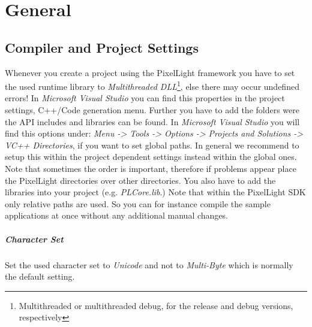 \chapter{General}




\section{Compiler and Project Settings}
Whenever you create a project using the PixelLight framework you have to set the used runtime library to \emph{Multithreaded \ac{DLL}}\footnote{Multithreaded or multithreaded debug, for the release and debug versions, respectively}, else there may occur undefined errors! In \emph{Microsoft Visual Studio} you can find this properties in the project settings, C++/Code generation menu. Further you have to add the folders were the \ac{API} includes and libraries can be found. In \emph{Microsoft Visual Studio} you will find this options under: \emph{Menu -> Tools -> Options -> Projects and Solutions -> VC++ Directories}, if you want to set global paths. In general we recommend to setup this within the project dependent settings instead within the global ones. Note that sometimes the order is important, therefore if problems appear place the PixelLight directories over other directories. You also have to add the libraries into your project (e.g. \emph{PLCore.lib}.) Note that within the PixelLight \ac{SDK} only relative paths are used. So you can for instance compile the sample applications at once without any additional manual changes.


\paragraph{Character Set}
Set the used character set to \emph{Unicode} and not to \emph{Multi-Byte} which is normally the default setting.


